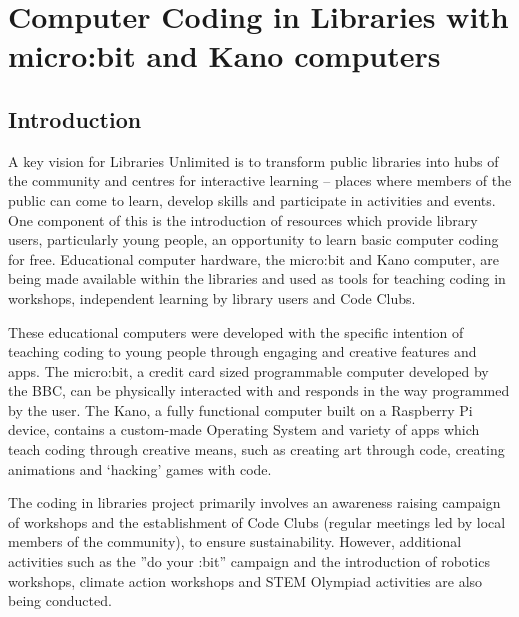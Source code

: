 \documentclass[12pt]{report} %
\begin{document}
\begin{titlepage}
\vfill %


\end{titlepage}


\tableofcontents %

\newpage %

\chapter{Computer Coding in Libraries with micro:bit and Kano computers} %
\section{Introduction}
A key vision for Libraries Unlimited is to transform public libraries into hubs of the community and centres for interactive learning -- places where members of the public can come to learn, develop skills and participate in activities and events. One component of this is the introduction of resources which provide library users, particularly young people, an opportunity to learn basic computer coding for free. Educational computer hardware, the micro:bit and Kano computer, are being made available within the libraries and used as tools for teaching coding in workshops, independent learning by library users and Code Clubs. 

These educational computers were developed with the specific intention of teaching coding to young people through engaging and creative features and apps. The micro:bit, a credit card sized programmable computer developed by the BBC, can be physically interacted with and responds in the way programmed by the user. The Kano, a fully functional computer built on a Raspberry Pi device, contains a custom-made Operating System and variety of apps which teach coding through creative means, such as creating art through code, creating animations and ‘hacking’ games with code. 

The coding in libraries project primarily involves an awareness raising campaign of workshops and the establishment of Code Clubs (regular meetings led by local members of the community), to ensure sustainability. However, additional activities such as the ''do your :bit'' campaign and the introduction of robotics workshops, climate action workshops and STEM Olympiad activities are also being conducted.
\end{document}
